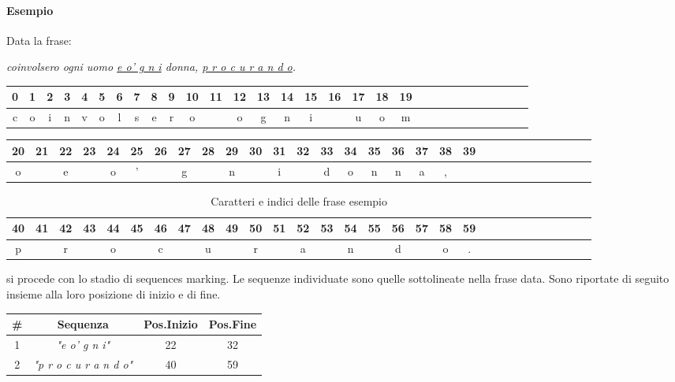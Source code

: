 
\paragraph{Esempio}
Data la frase:
\begin{center}
\textit{coinvolsero ogni uomo \ul{e o' g n i} donna, \ul{p r o c u r a n d o}.}
\end{center}


\begin{table}[H]
\centering
\tabcolsep=0.16cm
\begin{tabular}{|c|c|c|c|c|c|c|c|c|c|c|c|c|c|c|c|c|c|c|c|c|c|c|c|c|c|c|c|c|c|}
\hline
0&1&2&3&4&5&6&7&8&9&10&11&12&13&14&15&16&17&18&19\\
\hline
c&o&i&n&v&o&l&s&e&r&o& &o&g&n&i& &u&o&m\\
\hline
\end{tabular}
\end{table}
\begin{table}[H]
\centering
\tabcolsep=0.11cm
\begin{tabular}{|c|c|c|c|c|c|c|c|c|c|c|c|c|c|c|c|c|c|c|c|c|c|c|c|c|c|c|c|c|c|}
\hline
20&21&22&23&24&25&26&27&28&29&30&31&32&33&34&35&36&37&38&39\\
\hline
o& &e& &o&'& &g& &n& &i& &d&o&n&n&a&,&\\
\hline
\end{tabular}
\end{table}
\begin{table}[H]
\centering
\tabcolsep=0.11cm
\begin{tabular}{|c|c|c|c|c|c|c|c|c|c|c|c|c|c|c|c|c|c|c|c|c|c|c|c|c|c|c|c|c|c|}
\hline
40&41&42&43&44&45&46&47&48&49&50&51&52&53&54&55&56&57&58&59\\
\hline
p& &r& &o& &c& &u& &r& &a& &n& &d& &o&.\\
\hline
\end{tabular}
\caption{Caratteri e indici delle frase esempio}
\end{table}




si procede con lo stadio di sequences marking. Le sequenze individuate sono quelle sottolineate nella frase data. Sono riportate di seguito insieme alla loro posizione di inizio e di fine.
\begin{table}[H]
\centering
\begin{tabular}{cccc}
\#&\textbf{Sequenza} & \textbf{Pos.Inizio} & \textbf{Pos.Fine}\\ \hline
1&\textit{"e o' g n i"}&22& 32\\
2&\textit{"p r o c u r a n d o"}& 40& 59\\
\end{tabular}
\end{table}

